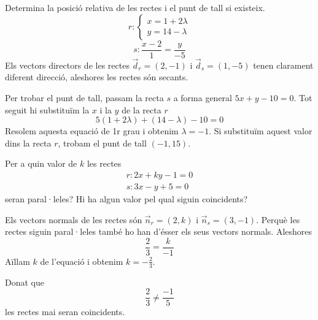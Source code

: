 \begin{resolt}[E]{Determina la posició relativa de les rectes i el punt de tall si existeix.
\begin{equation*}
	r: \left\{ \begin{array}{l} x=1+2\lambda \\ y= 14 - \lambda \end{array}\right.
\end{equation*}	
\begin{equation*}
	s: \frac{x-2}{1}=\frac{y}{-5}
\end{equation*}	
}
Els vectors directors de les rectes $\vec d_r = (2,-1)$ i $\vec d_s = (1,-5)$ tenen clarament diferent direcció, aleshores les rectes són secants.

Per trobar el punt de tall, passam la recta $s$ a forma general $5x+y-10=0$. Tot seguit hi substituïm la $x$ i la $y$ de la recta $r$
\begin{equation*}
5(1+2\lambda)+(14-\lambda)-10=0
\end{equation*}	
Resolem aquesta equació de 1r grau i obtenim $\lambda=-1$. Si substituïm aquest valor dins la recta $r$, trobam el punt de tall $(-1,15)$.
\end{resolt}
\vspace{-0.5cm}
\begin{resolt}{Per a quin valor de $k$ les rectes 
		\begin{eqnarray*}
		r: 2x+ky-1=0 \\
		s: 3x-y+5=0
		\end{eqnarray*}	
		seran paral·leles? Hi ha algun valor pel qual siguin coincidents?}
	
	Els vectors normals de les rectes són $\vec n_r=(2,k)$ i $\vec n_s=(3,-1)$. Perquè les rectes siguin paral·leles també ho han d'ésser els seus vectors normals. Aleshores
	\begin{equation*}
	 \frac{2}{3}=\frac{k}{-1}
	\end{equation*}	
	Aïllam $k$ de l'equació i obtenim $k=-\frac{2}{3}$.
	
	Donat que 
	\begin{equation*}
	\frac{2}{3}\neq \frac{-1}{5}
	\end{equation*}	
	les rectes mai seran coincidents.
\end{resolt}
		

